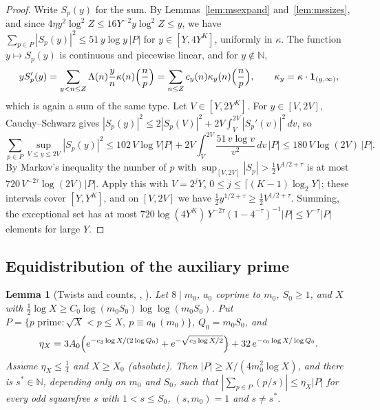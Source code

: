 \documentclass[11pt]{amsart}
\newcommand{\N}{\mathbb{N}}
\theoremstyle{plain}
\newtheorem{lemma}[theorem]{Lemma}
\theoremstyle{definition}
\numberwithin{equation}{section}
\begin{document}
\begin{proof}
Write $S_p(y)$ for the sum. By Lemmas~\ref{lem:msexpand} and~\ref{lem:mssizes}, and since
$4\eta y^2\log^2Z\le16Y^{-2}y\log^2Z\le y$, we have $\sum_{p\in P}|S_p(y)|^2\le51\,y\log y\,|P|$
for $y\in[Y,4Y^K]$, uniformly in $\kappa$. The function $y\mapsto S_p(y)$ is continuous and
piecewise linear, and for $y\notin\N$,
\[
yS_p'(y)=\sum_{y<n\le Z}\Lambda(n)\frac yn\kappa(n)\Bigl(\frac np\Bigr)=\sum_{n\le Z}c_y(n)\kappa_y(n)\Bigl(\frac np\Bigr),
\qquad\kappa_y=\kappa\cdot\mathbf 1_{(y,\infty)},
\]
which is again a sum of the same type. Let $V\in[Y,2Y^K]$. For $y\in[V,2V]$, Cauchy--Schwarz gives
$|S_p(y)|^2\le2|S_p(V)|^2+2V\int_V^{2V}|S_p'(v)|^2\,dv$, so
\[
\sum_{p\in P}\sup_{V\le y\le2V}|S_p(y)|^2\le102\,V\log V|P|+2V\int_V^{2V}\frac{51\,v\log v}{v^2}\,dv\,|P|
\le180\,V\log(2V)\,|P|.
\]
By Markov's inequality the number of $p$ with $\sup_{[V,2V]}|S_p|>\frac12V^{1/2+\tau}$ is at most
$720\,V^{-2\tau}\log(2V)|P|$. Apply this with $V=2^jY$, $0\le j\le\lceil(K-1)\log_2Y\rceil$; these
intervals cover $[Y,Y^K]$, and on $[V,2V]$ we have $\frac12y^{1/2+\tau}\ge\frac12V^{1/2+\tau}$.
Summing, the exceptional set has at most
$720\log(4Y^K)\,Y^{-2\tau}(1-4^{-\tau})^{-1}|P|\le Y^{-\tau}|P|$ elements for large $Y$.
\end{proof}

\subsection{Equidistribution of the auxiliary prime}

\begin{lemma}[Twists and counts, , ]\label{lem:twist}
Let $8\mid m_0$, $a_0$ coprime to $m_0$, $S_0\ge1$, and $X$ with
$\frac12\log X\ge C_0\log(m_0S_0)\log\log(m_0S_0)$. Put $P=\{p\text{ prime}:\sqrt X<p\le X,\ p\equiv a_0\ (m_0)\}$,
$Q_0=m_0S_0$, and
\[
\eta_X=3A_0\Bigl(e^{-c_3\log X/(2\log Q_0)}+e^{-\sqrt{c_3\log X/2}}\Bigr)+32\,e^{-c_0\log X/\log Q_0}.
\]
Assume $\eta_X\le\frac14$ and $X\ge X_0$ (absolute). Then $|P|\ge X/(4m_0^2\log X)$, and there is $s^\ast\in\N$, depending
only on $m_0$ and $S_0$, such that $|\sum_{p\in P}(p/s)|\le\eta_X|P|$ for every odd squarefree
$s$ with $1<s\le S_0$, $(s,m_0)=1$ and $s\ne s^\ast$.
\end{lemma}
\end{document}
